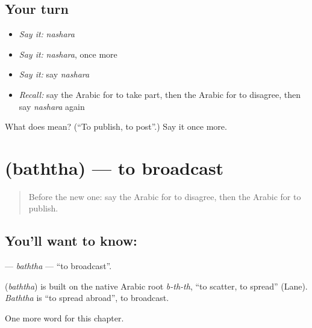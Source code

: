 \subsection*{Your turn}
\begin{itemize}
\raggedright
  \item \emph{Say it:} \emph{nashara}
  \item \emph{Say it:} \emph{nashara}, once more
  \item \emph{Say it:} say \emph{nashara}
  \item \emph{Recall:} say the Arabic for to take part, then the Arabic for to disagree, then say \emph{nashara} again
\end{itemize}

\begin{tcolorbox}[breakable,colback=teal!4,colframe=teal!35!black,title={Before you move on}]
What does  mean? (\textquotedblleft{}To publish, to post\textquotedblright{}.) Say it once more.
\end{tcolorbox}
\section[\texorpdfstring{\ar{بث} (baththa)}{بث (baththa)}]{ (baththa) — to broadcast}

\label{lesson:AR-C259-baththa}



\begin{quote}
Before the new one: say the Arabic for to disagree, then the Arabic for to publish.
\end{quote}

\subsection*{You'll want to know: }
\textbf{} — \emph{baththa} — \textquotedblleft{}to broadcast\textquotedblright{}.

\begin{cousinweb}
\textbf{} (\emph{baththa}) is built on the native Arabic root \emph{b-th-th}, \textquotedblleft{}to scatter, to spread\textquotedblright{} (Lane). \emph{Baththa} is \textquotedblleft{}to spread abroad\textquotedblright{}, to broadcast.
\end{cousinweb}

\begin{grammarlens}[title={What you've built}]
One more word for this chapter.
\end{grammarlens}

